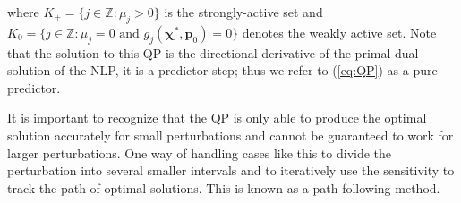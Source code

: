 where $K_+=\{j\in\mathbb{Z}:\mu_j>0\}$ is the strongly-active set and $K_0=\{j\in\mathbb{Z}:\mu_j=0 \text{ and } g_j(\boldsymbol{\chi}^*,\boldsymbol{p}_0)=0\}$ denotes the weakly active set.
Note that the solution to this QP is the directional derivative of the primal-dual solution of the NLP, it is a predictor step; thus we refer to (\ref{eq:QP}) as a pure-predictor.
\par
It is important to recognize that the QP is only able to produce the optimal solution accurately for small perturbations and cannot be guaranteed to work for larger perturbations.
One way of handling cases like this to divide the perturbation into several smaller intervals and to iteratively use the sensitivity to track the path of optimal solutions.
This is known as a path-following method.
